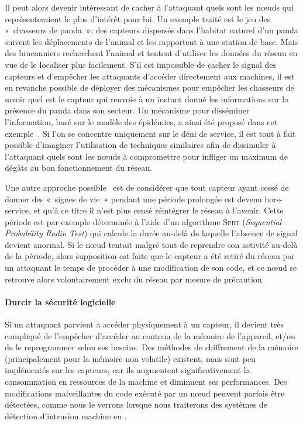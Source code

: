 Il peut alors devenir intéressant de cacher à l'attaquant quels sont les nœuds qui représenteraient le plus d'intérêt pour lui.
Un exemple traité est le jeu des « chasseurs de panda »: des capteurs dispersés dans l'habitat naturel d'un panda suivent les déplacements de l'animal et les rapportent à une station de base.
Mais des braconniers recherchent l'animal et tentent d'utiliser les données du réseau en vue de le localiser plus facilement.
S'il est impossible de cacher le signal des capteurs et d'empêcher les attaquants d'accéder directement aux machines, il est en revanche possible de déployer des mécanismes pour empêcher les chasseurs de savoir quel est le capteur qui renvoie à un instant donné les informations sur la présence du panda dans son secteur.
Un mécanisme pour disséminer l'information, basé sur le modèle des épidémies, a ainsi été proposé dans cet exemple~\cite{KDA14}.
Si l'on se concentre uniquement sur le déni de service, il est tout à fait possible d'imaginer l'utilisation de techniques similaires afin de dissimuler à l'attaquant quels sont les nœuds à compromettre pour infliger un maximum de dégâts au bon fonctionnement du réseau.

Une autre approche possible~\cite{Ho10} est de considérer que tout capteur ayant cessé de donner des « signes de vie » pendant une période prolongée est devenu hors-service, et qu'à ce titre il n'est plus censé réintégrer le réseau à l'avenir.
Cette période est par exemple déterminée à l'aide d'un algorithme \textsc{Sprt} (\textit{Sequential Probability Radio Test}) qui calcule la durée au-delà de laquelle l'absence de signal devient anormal.
Si le nœud tentait malgré tout de reprendre son activité au-delà de la période, alors supposition est faite que le capteur a été retiré du réseau par un attaquant le temps de procéder à une modification de son code, et ce nœud se retrouve alors volontairement exclu du réseau par mesure de précaution.

        \paragraph{Durcir la sécurité logicielle}
Si un attaquant parvient à accéder physiquement à un capteur, il devient très compliqué de l'empêcher d'accéder au contenu de la mémoire de l'appareil, et/ou de le reprogrammer selon ses besoins.
Des méthodes de chiffrement de la mémoire (principalement pour la mémoire non volatile) existent, mais sont peu implémentés sur les capteurs, car ils augmentent significativement la consommation en ressources de la machine et diminuent ses performances.
Des modifications malveillantes du code exécuté par un nœud peuvent parfois être détectées, comme nous le verrons lorsque nous traiterons des systèmes de détection d'intrusion machine en .

